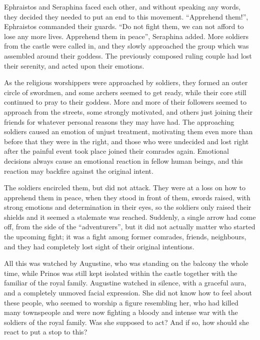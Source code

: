 Ephraistos and Seraphina faced each other, and without speaking any words, they decided they needed to put an end to this movement. \enquote{Apprehend them!}, Ephraistos commanded their guards. \enquote{Do not fight them, we can not afford to lose any more lives. Apprehend them in peace}, Seraphina added. More soldiers from the castle were called in, and they slowly approached the group which was assembled around their goddess. The previously composed ruling couple had lost their serenity, and acted upon their emotions.

As the religious worshippers were approached by soldiers, they formed an outer circle of swordmen, and some archers seemed to get ready, while their core still continued to pray to their goddess. More and more of their followers seemed to approach from the streets, some strongly motivated, and others just joining their friends for whatever personal reasons they may have had. The approaching soldiers caused an emotion of unjust treatment, motivating them even more than before that they were in the right, and those who were undecided and lost right after the painful event took place joined their comrades again. Emotional decisions always cause an emotional reaction in fellow human beings, and this reaction may backfire against the original intent.

The soldiers encircled them, but did not attack. They were at a loss on how to apprehend them in peace, when they stood in front of them, swords raised, with strong emotions and determination in their eyes, so the soldiers only raised their shields and it seemed a stalemate was reached. Suddenly, a single arrow had come off, from the side of the \enquote{adventurers}, but it did not actually matter who started the upcoming fight; it was a fight among former comrades, friends, neighbours, and they had completely lost sight of their original intentions.

All this was watched by Augustine, who was standing on the balcony the whole time, while Prinos was still kept isolated within the castle together with the familiar of the royal family. Augustine watched in silence, with a graceful aura, and a completely unmoved facial expression. She did not know how to feel about these people, who seemed to worship a figure resembling her, who had killed many townspeople and were now fighting a bloody and intense war with the soldiers of the royal family. Was she supposed to act? And if so, how should she react to put a stop to this?

